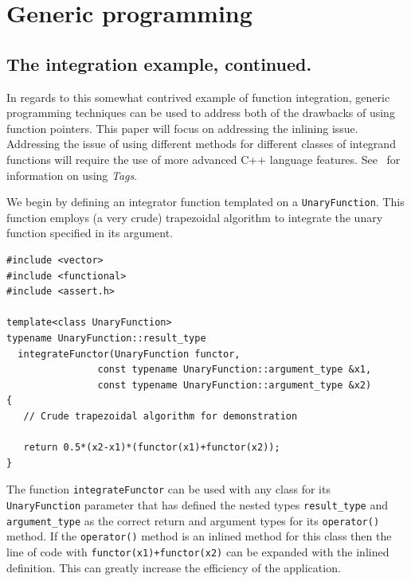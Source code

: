 \documentclass[reqno]{lanl}
\begin{document}
\section{Generic programming}

\subsection{The integration example, continued.}
In regards to this somewhat contrived example of function integration,
generic programming techniques
can be used to address both of the drawbacks of using
function pointers.
This paper will focus on addressing the inlining issue.
Addressing the issue of using different methods for different classes
of integrand functions will require the use of more advanced
C++ language features.
See~\cite{Austern99}
for information on using \emph{Tags}.

We begin by defining an integrator 
function templated on a \texttt{UnaryFunction}.
This function employs
(a very crude) trapezoidal algorithm to integrate the unary
function specified in its argument.
%
 \begin{verbatim}
#include <vector>
#include <functional>
#include <assert.h>

template<class UnaryFunction>
typename UnaryFunction::result_type 
  integrateFunctor(UnaryFunction functor,
                const typename UnaryFunction::argument_type &x1,
                const typename UnaryFunction::argument_type &x2)
{
   // Crude trapezoidal algorithm for demonstration

   return 0.5*(x2-x1)*(functor(x1)+functor(x2));
}
\end{verbatim} \normalcolor
%

The function \texttt{integrateFunctor} can be used with any class
for its \texttt{UnaryFunction} parameter that has
defined the nested types \texttt{result\_type} and \texttt{argument\_type}
as the correct return and argument types for its \texttt{operator()} method.
If the \texttt{operator()} method is an inlined method for this class
then the line of code with \texttt{functor(x1)+functor(x2)}
can be expanded with the inlined definition.
This can greatly increase the efficiency of the application.
\end{document}
